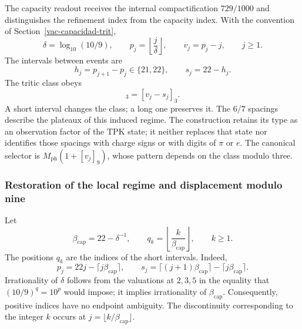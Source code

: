 The capacity readout receives the internal compactification $729/1000$ and
distinguishes the refinement index from the capacity index. With the
convention of Section~\ref{vac-capacidad-trit},
\begin{equation}
 \delta=\log_{10}(10/9),\qquad
 p_j=\left\lfloor\frac{j}{\delta}\right\rfloor,\qquad
 v_j=p_j-j,\qquad j\geq1.
 \label{md:restop:capacidad}
\end{equation}
The intervals between events are
\begin{equation}
 h_j=p_{j+1}-p_j\in\{21,22\},\qquad
 s_j=22-h_j.
 \label{md:restop:intervalos}
\end{equation}
The tritic class obeys
\begin{equation}
 [v_{j+1}]_3=[v_j-s_j]_3.
 \label{md:restop:clase-tritica}
\end{equation}
A short interval changes the class; a long one preserves it.
The $6/7$ spacings describe the plateaux of this induced regime.
The construction retains its type as an observation factor of the TPK state;
it neither replaces that state nor identifies those spacings with charge
signs or with digits of $\pi$ or $e$.
The canonical selector is
$M_{\mathrm{ph}}(1+[v_j]_9)$, whose pattern depends on the class modulo three.

\subsubsection{Restoration of the local regime and displacement modulo nine}
\label{md:restop:consecuencia-capacidad}

Let
\begin{equation}
 \beta_{\mathrm{cap}}=22-\delta^{-1},\qquad
 q_k=\left\lfloor\frac{k}{\beta_{\mathrm{cap}}}\right\rfloor,\qquad k\geq1.
 \label{md:restop:pendiente-inducida}
\end{equation}
The positions $q_k$ are the indices of the short intervals. Indeed,
\begin{equation}
 p_j=22j-\lceil j\beta_{\mathrm{cap}}\rceil,\qquad
 s_j=\lceil(j+1)\beta_{\mathrm{cap}}\rceil
     -\lceil j\beta_{\mathrm{cap}}\rceil.
 \label{md:restop:eventos-cortos}
\end{equation}
Irrationality of $\delta$ follows from the valuations at $2,3,5$
in the equality that $(10/9)^q=10^p$ would impose; it implies irrationality of
$\beta_{\mathrm{cap}}$. Consequently, positive indices have no
endpoint ambiguity. The discontinuity corresponding to the integer $k$
occurs at $j=\lfloor k/\beta_{\mathrm{cap}}\rfloor$.

